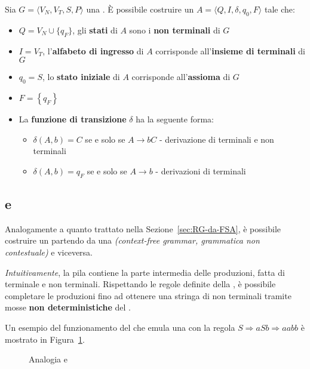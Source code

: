 \documentclass[italian, 10pt]{article}
\begin{document}
Sia \(G = \langle V_N, V_T, S, P \rangle\) una \RG.
È possibile costruire un \FSA \(A = \langle Q, I, \delta, q_0, F \rangle\) tale che:

\begin{itemize}
  \item \(Q = V_N \cup \{q_F\}\), gli \textbf{stati} di \(A\) sono i \textbf{non terminali} di \(G\)
  \item \(I = V_T\), l'\textbf{alfabeto di ingresso} di \(A\) corrisponde all'\textbf{insieme di terminali} di \(G\)
  \item \(q_0 = S\), lo \textbf{stato iniziale} di \(A\) corrisponde all'\textbf{assioma} di \(G\)
  \item \(F = \left\{q_F\right\}\)
  \item La \textbf{funzione di transizione} \(\delta\) ha la seguente forma:
        \begin{itemize}
          \item \(\delta(A, b) = C\) se e solo se \(A \rightarrow bC\) - derivazione di terminali e non terminali
          \item \(\delta(A, b) = q_F\) se e solo se \(A \rightarrow b\) - derivazioni di terminali
        \end{itemize}
\end{itemize}

\subsection{\CFG e \NPDA}

Analogamente a quanto trattato nella Sezione~\ref{sec:RG-da-FSA}, è possibile costruire un \NPDA partendo da una \CFG \textit{(context-free grammar, grammatica non contestuale)} e viceversa.

\textit{Intuitivamente}, la pila contiene la parte intermedia delle produzioni, fatta di terminale e non terminali.
Rispettando le regole definite della \CFG, è possibile completare le produzioni fino ad ottenere una stringa di non terminali tramite mosse \textbf{non deterministiche} del \NPDA.

Un esempio del funzionamento del \NPDA che emula una \CFG con la regola \(S \Rightarrow aSb \Rightarrow aabb\) è mostrato in Figura~\ref{fig:analogia-cfg-npda}.

\begin{figure}[htbp]
  \bigskip
  \centering
  \caption{Analogia \CFG e \NPDA}
  \label{fig:analogia-cfg-npda}
\end{figure}
\end{document}
